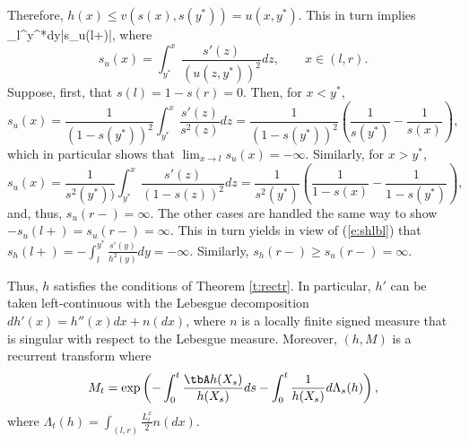 \documentclass[11pt,reqno]{amsart}
\numberwithin{equation}{section}
\def\rar{\rightarrow}
\begin{document}
\begin{enumerate}[leftmargin=*]
		Therefore, $h(x) \leq v(s(x), s(y^*))=u(x,y^*)$. This in turn implies
		\be \label{e:shlbl}
		\int_l^{y^*}dy\geq |s_u(l+)|,
		\ee
		 where
		\[
		s_u(x)=\int_{y^*}^x \frac{s'(z)}{(u(z,y^*))^2}dz, \qquad x\in (l,r).
		\]
		Suppose, first, that $s(l)=1-s(r)=0$. Then, for $x <y^*$,
		\[
		s_u(x)=\frac{1}{(1-s(y^*))^2}\int_{y^*}^x\frac{s'(z)}{s^2(z)}dz=\frac{1}{(1-s(y^*))^2}\left(\frac{1}{s(y^*)}-\frac{1}{s(x)}\right),
		\]
		which in particular shows that $\lim_{x \rar l}s_u(x)=-\infty$. Similarly, for $x >y^*$,
		\[
		s_u(x)=\frac{1}{s^2(y^*))}\int_{y^*}^x\frac{s'(z)}{(1-s(z))^2}dz=\frac{1}{s^2(y^*)}\left(\frac{1}{1-s(x)}-\frac{1}{1-s(y^*)}\right),
		\]
		and, thus, $s_u(r-)=\infty$. The other cases are handled  the same way to show $-s_u(l+)=s_u(r-)=\infty$. This in turn yields in view of (\ref{e:shlbl}) that $s_h(l+)=-\int_l^{y^*} \frac{s'(y)}{h^2(y)}dy=-\infty$. Similarly, $s_h(r-)\geq s_u(r-)=\infty$.
		
		Thus, $h$ satisfies the conditions of Theorem \ref{t:rectr}. In particular,  $h'$ can be taken left-continuous with the Lebesgue decomposition $dh'(x)=h''(x)dx+ n(dx)$, where $n$ is a locally finite signed measure that is singular with respect to the Lebesgue measure. Moreover, $(h,M)$ is a recurrent transform where
		\[
		M_t=\exp\left(-\int_0^t \frac{\tbA h(X_s)}{h(X_s)}ds -\int_0^t \frac{1}{h(X_s)}d\Lambda_s(h)\right),
		\]
		where $\Lambda_t(h)=\int_{(l,r)} \frac{L^x_t}{2}n(dx)$. 
		

\end{enumerate}
\end{document}
